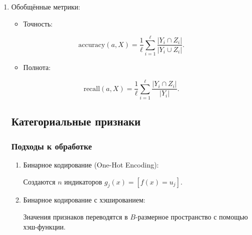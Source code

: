 \begin{enumerate}
\def\labelenumi{\arabic{enumi}.}
\setcounter{enumi}{1}
\tightlist
\item
  Обобщённые метрики:

  \begin{itemize}
  \tightlist
  \item
    Точность:
  \end{itemize}


\begin{equation}
\text{accuracy}(a, X) = \frac{1}{\ell} \sum_{i=1}^\ell \frac{|Y_i \cap Z_i|}{|Y_i \cup Z_i|}.
\end{equation}

\begin{itemize}
\tightlist
\item
  Полнота:
\end{itemize}

\begin{equation}
\text{recall}(a, X) = \frac{1}{\ell} \sum_{i=1}^\ell \frac{|Y_i \cap Z_i|}{|Y_i|}.
\end{equation}

\hypertarget{ux43aux430ux442ux435ux433ux43eux440ux438ux430ux43bux44cux43dux44bux435-ux43fux440ux438ux437ux43dux430ux43aux438-1}{%
\subsection*{Категориальные
признаки}\label{ux43aux430ux442ux435ux433ux43eux440ux438ux430ux43bux44cux43dux44bux435-ux43fux440ux438ux437ux43dux430ux43aux438-1}}

\hypertarget{ux43fux43eux434ux445ux43eux434ux44b-ux43a-ux43eux431ux440ux430ux431ux43eux442ux43aux435}{%
\subsubsection*{Подходы к
обработке}\label{ux43fux43eux434ux445ux43eux434ux44b-ux43a-ux43eux431ux440ux430ux431ux43eux442ux43aux435}}

\begin{enumerate}
\def\labelenumi{\arabic{enumi}.}
\tightlist
\item
  Бинарное кодирование (One-Hot Encoding):

    Создаются \(n\) индикаторов \(g_j(x) = [f(x) = u_j]\).
    
\item
  Бинарное кодирование с хэшированием:

    Значения признаков переводятся в \(B\)-размерное пространство с
    помощью хэш-функции.
    

\end{enumerate}
\end{enumerate}
